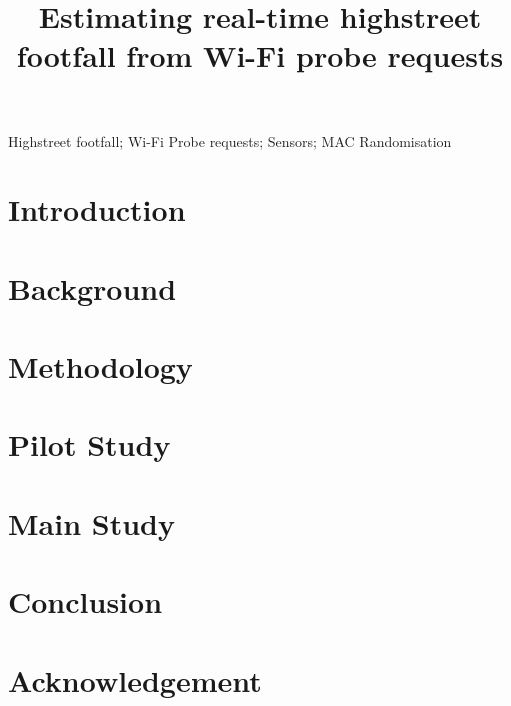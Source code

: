 \documentclass[]{interact}
\theoremstyle{plain}
\theoremstyle{definition}
\theoremstyle{remark}
\begin{document}
	\title{Estimating real-time highstreet footfall from Wi-Fi probe requests}
	\author{
	}
	\maketitle
	\begin{abstract}
		 \end{abstract}
	\begin{keywords}
		Highstreet footfall; Wi-Fi Probe requests; Sensors; MAC Randomisation \end{keywords}
	\section{Introduction}\label{introduction}
		
	\section{Background}\label{previous_work}
		
	\section{Methodology}\label{methodology}
		
	\section{Pilot Study}\label{pilot_study}
		
	\section{Main Study}\label{main_study}
		
	\section{Conclusion}\label{conclusion}
		
	\section*{Acknowledgement}
		
	 
\end{document}
